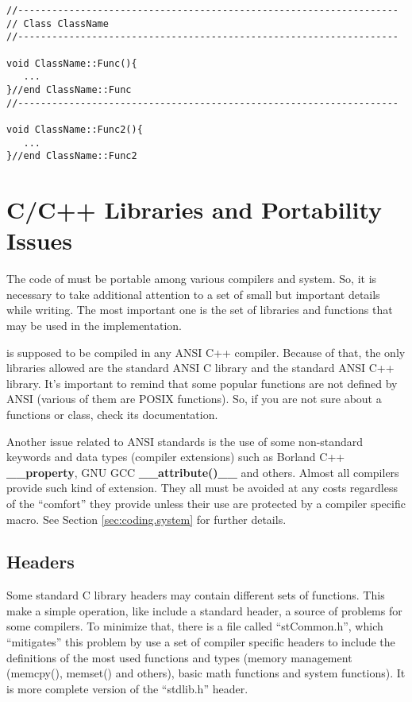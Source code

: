 \begin{code}
\begin{verbatim}
//-------------------------------------------------------------------
// Class ClassName
//-------------------------------------------------------------------

void ClassName::Func(){
   ...
}//end ClassName::Func
//-------------------------------------------------------------------

void ClassName::Func2(){
   ...
}//end ClassName::Func2
\end{verbatim}
\end{code}

\section{C/C++ Libraries and Portability Issues}
\label{sec:coding.portable}

The code of \libname{ } must be portable among various compilers and system. So, it is necessary to take additional attention to a set of small but important details while writing. The most important one is the set of libraries and functions that may be used in the implementation.

\libname{ } is supposed to be compiled in any ANSI C++ compiler. Because of that, the only libraries allowed are the standard ANSI C library and the standard ANSI C++ library. It's important to remind that some popular functions are not defined by ANSI (various of them are POSIX functions). So, if you are not sure about a functions or class, check its documentation.

Another issue related to ANSI standards is the use of some non-standard keywords and data types (compiler extensions) such as Borland C++ {\bf \_\_property}, GNU GCC {\bf \_\_attribute()\_\_} and others. Almost all compilers provide such kind of extension. They all must be avoided at any costs regardless of the ``comfort'' they provide unless their use are protected by a compiler specific macro. See Section \ref{sec:coding.system} for further details.

\subsection{Headers}
\label{sec:coding.headers}

Some standard C library headers may contain different sets of functions. This make a simple operation, like include a standard header, a source of problems for some compilers. To minimize that, there is a file called ``stCommon.h'', which ``mitigates'' this problem by use a set of compiler specific headers to include the definitions of the most used functions and types (memory management (memcpy(), memset() and others), basic math functions and system functions). It is more complete version of the ``stdlib.h'' header.

